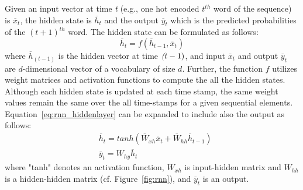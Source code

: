 Given an input vector at time \textit{t} (e.g., one hot encoded $t^{th}$ word of the sequence) is $\overline{x}_t$, the hidden state is $\overline{h}_t$ and the output $\overline{y}_t$ which is the predicted probabilities of the $(t+1)^{th}$ word. The hidden state can be formulated as follows:
    \begin{equation}
    \label{eq:rnn_hiddenlayer}
    \overline{h}_t = f(\overline{h}_{t-1},\overline{x}_{t})
\end{equation}
where $\overline{h}_{(t-1)}$ is the hidden vector at time $\textit (t-1)$, and input $\overline{x}_t$ and output $\overline{y}_t$ are $d$-dimensional vector of a vocabulary of size $d$. Further, the function $f$ utilizes weight matrices and activation functions to compute the all the hidden states. Although each hidden state is updated at each time stamp, the same weight values remain the same over the all time-stamps for a given sequential elements. 
Equation~\ref{eq:rnn_hiddenlayer} can be expanded to include also the output  as follows:
 \begin{equation}
 \begin{aligned}
    \label{eq:rnn_hiddenlayer}
    &\overline{h}_t = tanh(\overline{W}_{xh}\overline{x}_{t} +  \overline{W}_{hh}\overline{h}_{t-1})\\
    &\overline{y}_t = W_{hy}\overline{h}_{t}
\end{aligned}
\end{equation}
where "tanh" denotes an activation function, $W_{xh}$ is input-hidden matrix and $W_{hh}$ is a hidden-hidden matrix (cf. Figure~\ref{fig:rnn}), and $\overline{y}_t$ is an output.  

